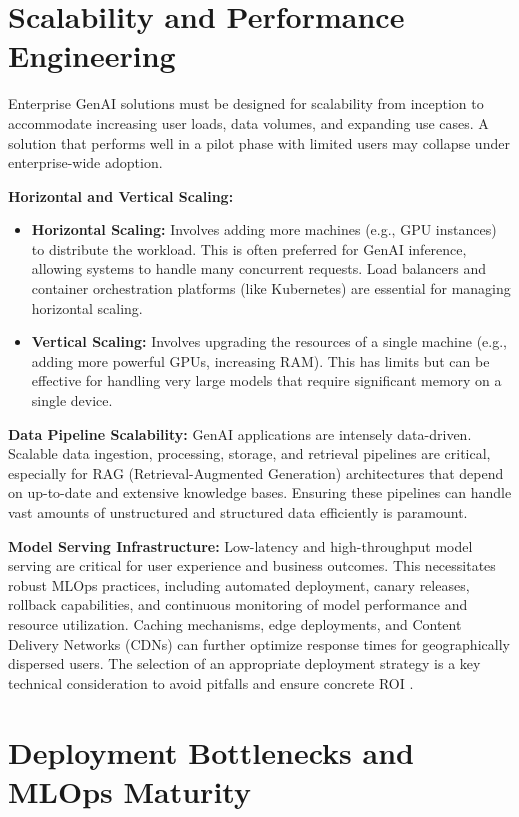 \documentclass{article}
\begin{document}
\section{Scalability and Performance Engineering}


Enterprise GenAI solutions must be designed for scalability from inception to accommodate increasing user loads, data volumes, and expanding use cases. A solution that performs well in a pilot phase with limited users may collapse under enterprise-wide adoption.

\textbf{Horizontal and Vertical Scaling:}
\begin{itemize}
  \item \textbf{Horizontal Scaling:} Involves adding more machines (e.g., GPU instances) to distribute the workload. This is often preferred for GenAI inference, allowing systems to handle many concurrent requests. Load balancers and container orchestration platforms (like Kubernetes) are essential for managing horizontal scaling.
  \item \textbf{Vertical Scaling:} Involves upgrading the resources of a single machine (e.g., adding more powerful GPUs, increasing RAM). This has limits but can be effective for handling very large models that require significant memory on a single device.
\end{itemize}

\textbf{Data Pipeline Scalability:} GenAI applications are intensely data-driven. Scalable data ingestion, processing, storage, and retrieval pipelines are critical, especially for RAG (Retrieval-Augmented Generation) architectures that depend on up-to-date and extensive knowledge bases. Ensuring these pipelines can handle vast amounts of unstructured and structured data efficiently is paramount.

\textbf{Model Serving Infrastructure:} Low-latency and high-throughput model serving are critical for user experience and business outcomes. This necessitates robust MLOps practices, including automated deployment, canary releases, rollback capabilities, and continuous monitoring of model performance and resource utilization. Caching mechanisms, edge deployments, and Content Delivery Networks (CDNs) can further optimize response times for geographically dispersed users. The selection of an appropriate deployment strategy is a key technical consideration to avoid pitfalls and ensure concrete ROI \cite{openalex_w4400993506}.


\section{Deployment Bottlenecks and MLOps Maturity}
\end{document}
